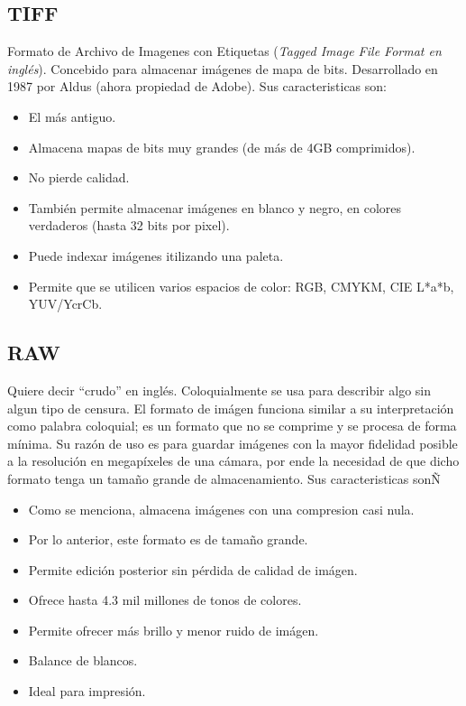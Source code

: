 \documentclass[letterpaper, 12pt]{article}
\begin{document}
    \subsection*{TIFF}
    Formato de Archivo de Imagenes con Etiquetas (\emph{Tagged Image File Format en inglés}). Concebido para almacenar imágenes de mapa de bits. Desarrollado en
    1987 por Aldus (ahora propiedad de Adobe). Sus caracteristicas son:
    \begin{itemize}
        \item El más antiguo.
        \item Almacena mapas de bits muy grandes (de más de 4GB comprimidos).
        \item No pierde calidad.
        \item También permite almacenar imágenes en blanco y negro, en colores verdaderos (hasta 32 bits por pixel).
        \item Puede indexar imágenes itilizando una paleta.
        \item Permite que se utilicen varios espacios de color: RGB, CMYKM, CIE L*a*b, YUV/YcrCb. 
    \end{itemize}\par
    \vspace{\baselineskip}
    \subsection*{RAW}
    Quiere decir ``crudo'' en inglés. Coloquialmente se usa para describir algo sin algun tipo de censura. El formato de imágen funciona similar a su interpretación
    como palabra coloquial; es un formato que no se comprime y se procesa de forma mínima. Su razón de uso es para guardar imágenes con la mayor fidelidad posible a la
    resolución en megapíxeles de una cámara, por ende la necesidad de que dicho formato tenga un tamaño grande de almacenamiento. Sus caracteristicas sonÑ
    \begin{itemize}
        \item Como se menciona, almacena imágenes con una compresion casi nula.
        \item Por lo anterior, este formato es de tamaño grande.
        \item Permite edición posterior sin pérdida de calidad de imágen.
        \item Ofrece hasta 4.3 mil millones de tonos de colores.
        \item Permite ofrecer más brillo y menor ruido de imágen.
        \item Balance de blancos.
        \item Ideal para impresión.
    \end{itemize}\par
    \vspace{\baselineskip}
\end{document}
